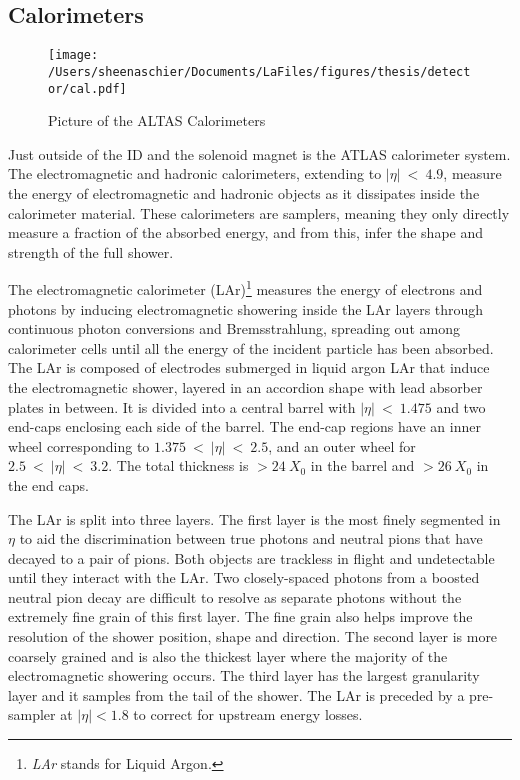 \subsection{Calorimeters}
  \begin{figure}[tbp]
  \centering
 \texttt{[image: /Users/sheenaschier/Documents/LaFiles/figures/thesis/detector/cal.pdf]}
    \caption{Picture of the ALTAS Calorimeters}
   \label{fig:cal}
 \end{figure}
 Just outside of the ID and the solenoid magnet is the ATLAS calorimeter system.  The electromagnetic and hadronic calorimeters, extending to $|\eta|~<~4.9$, measure the energy of electromagnetic and hadronic objects as it dissipates inside the calorimeter material.  These calorimeters are samplers, meaning they only directly measure a fraction of the absorbed energy, and from this, infer the shape and strength of the full shower.


The electromagnetic calorimeter (LAr)\footnote{\textit{LAr} stands for Liquid Argon.} measures the energy of electrons and photons by inducing electromagnetic showering inside the LAr layers through continuous photon conversions and Bremsstrahlung, spreading out among calorimeter cells until all the energy of the incident particle has been absorbed.  The LAr is composed of electrodes submerged in liquid argon LAr that induce the electromagnetic shower, layered in an accordion shape with lead absorber plates in between. It is divided into a central barrel with $|\eta|~<~1.475$ and two end-caps enclosing each side of the barrel.  The end-cap regions have an inner wheel corresponding to $1.375~<~|\eta|~<~2.5$, and an outer wheel for $2.5~<~|\eta|~<~3.2$.  The total thickness is $> 24~X_0$ in the barrel and $>26~X_0 $ in the end caps.  

The LAr is split into three layers.  The first layer is the most finely segmented in $\eta$ to aid the discrimination between true photons and neutral pions that have decayed to a pair of pions.  Both objects are trackless in flight and undetectable until they interact with the LAr.  Two closely-spaced photons from a boosted neutral pion decay are difficult to resolve as separate photons without the extremely fine grain of this first layer.  The fine grain also helps improve the resolution of the shower position, shape and direction.  The second layer is more coarsely grained and is also the thickest layer where the majority of the electromagnetic showering occurs.  The third layer has the largest granularity layer and it samples from the tail of the shower.  The LAr is preceded by a pre-sampler at $|\eta| < 1.8$ to correct for upstream energy losses. 


